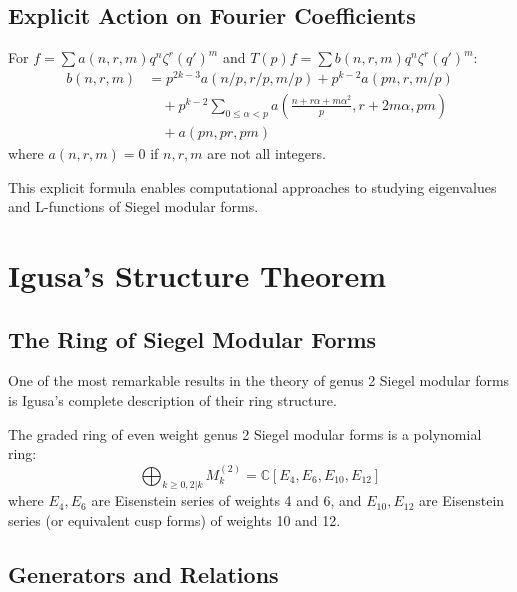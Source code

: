 \subsection{Explicit Action on Fourier Coefficients}

\begin{theorem}
\label{thm:hecke_action_formula}
For $f = \sum a(n,r,m) q^n \zeta^r (q')^m$ and $T(p)f = \sum b(n,r,m) q^n \zeta^r (q')^m$:
\begin{align}
b(n,r,m) &= p^{2k-3} a(n/p, r/p, m/p) + p^{k-2} a(pn, r, m/p) \\
&\quad + p^{k-2} \sum_{0 \leq \alpha < p} a\left(\frac{n + r\alpha + m\alpha^2}{p}, r + 2m\alpha, pm\right) \\
&\quad + a(pn, pr, pm)
\end{align}
where $a(n,r,m) = 0$ if $n,r,m$ are not all integers.
\end{theorem}

This explicit formula enables computational approaches to studying eigenvalues and L-functions of Siegel modular forms.

\section{Igusa's Structure Theorem}
\label{sec:igusa_structure}

\subsection{The Ring of Siegel Modular Forms}

One of the most remarkable results in the theory of genus 2 Siegel modular forms is Igusa's complete description of their ring structure.

\begin{theorem}
\label{thm:igusa_structure}
The graded ring of even weight genus 2 Siegel modular forms is a polynomial ring:
\begin{equation}
\bigoplus_{k \geq 0, 2|k} M_k^{(2)} = \mathbb{C}[E_4, E_6, E_{10}, E_{12}]
\label{eq:igusa_ring}
\end{equation}
where $E_4, E_6$ are Eisenstein series of weights 4 and 6, and $E_{10}, E_{12}$ are Eisenstein series (or equivalent cusp forms) of weights 10 and 12.
\end{theorem}

\subsection{Generators and Relations}

